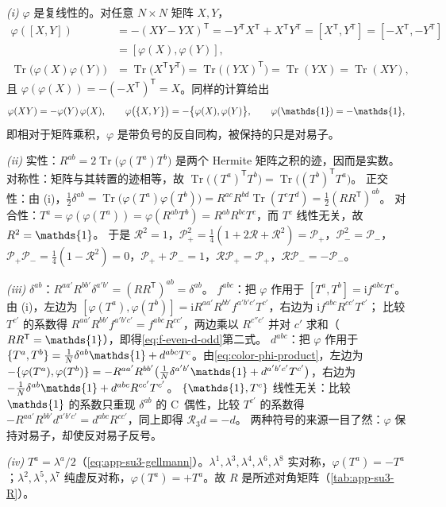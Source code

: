 \documentclass[UTF8,a4paper,11pt,fontset=fandol]{ctexart}
\makeatletter
\let\amsmathbb\mathbb
\renewcommand{\mathbb}[1]{\ifx1#1\mathds{1}\else\amsmathbb{#1}\fi}
\theoremstyle{cplain}
\theoremstyle{cdefinition}
\theoremstyle{cremark}
\renewcommand{\proofname}{证明}
\renewenvironment{proof}[1][\proofname]{\par\pushQED{\qed}\normalfont\topsep6\p@\@plus6\p@\relax
  \trivlist\item[\hskip\labelsep\itshape #1\hspace{0.5em}]\ignorespaces}{\popQED\endtrivlist\@endpefalse}
\numberwithin{equation}{section}
\DeclareMathOperator{\Tr}{Tr}
\newcommand{\tp}{\mathsf{T}}                         %
\newcommand{\Rop}{\mathcal{R}}                       %
\newcommand{\Pp}{\mathcal{P}_{+}}                    %
\newcommand{\Pm}{\mathcal{P}_{-}}                    %
\newcommand{\ii}{\mathrm{i}}                        %
\makeatother
\begin{document}
\begin{proof}
\emph{(i)} $\varphi$ 是复线性的。对任意 $N\times N$ 矩阵 $X,Y$，
\begin{align*}
\varphi([X,Y])&=-(XY-YX)^{\tp}=-Y^{\tp}X^{\tp}+X^{\tp}Y^{\tp}=[X^{\tp},Y^{\tp}]=[-X^{\tp},-Y^{\tp}]\\
&=[\varphi(X),\varphi(Y)],\\
\Tr\bigl(\varphi(X)\varphi(Y)\bigr)&=\Tr\bigl(X^{\tp}Y^{\tp}\bigr)=\Tr\bigl((YX)^{\tp}\bigr)=\Tr(YX)=\Tr(XY),
\end{align*}
且 $\varphi(\varphi(X))=-(-X^{\tp})^{\tp}=X$。同样的计算给出
\begin{equation}\label{eq:color-phi-product}
\varphi(XY)=-\varphi(Y)\,\varphi(X),\qquad \varphi\bigl(\{X,Y\}\bigr)=-\bigl\{\varphi(X),\varphi(Y)\bigr\},\qquad\varphi(\mathbb 1)=-\mathbb 1 ,
\end{equation}
即相对于矩阵乘积，$\varphi$ 是带负号的反自同构，被保持的只是对易子。

\emph{(ii)} 实性：$R^{ab}=2\Tr\bigl(\varphi(T^a)T^b\bigr)$ 是两个 Hermite 矩阵之积的迹，因而是实数。
对称性：矩阵与其转置的迹相等，故 $\Tr\bigl((T^a)^{\tp}T^b\bigr)=\Tr\bigl((T^b)^{\tp}T^a\bigr)$。
正交性：由 (i)，$\tfrac12\delta^{ab}=\Tr\bigl(\varphi(T^a)\varphi(T^b)\bigr)=R^{ac}R^{bd}\Tr(T^cT^d)=\tfrac12(RR^{\tp})^{ab}$。
对合性：$T^a=\varphi(\varphi(T^a))=\varphi(R^{ab}T^b)=R^{ab}R^{bc}T^c$，而 $T^c$ 线性无关，故 $R^2=\mathbb 1$。
于是 $\Rop^2=1$，$\Pp^2=\tfrac14(1+2\Rop+\Rop^2)=\Pp$，$\Pm^2=\Pm$，$\Pp\Pm=\tfrac14(1-\Rop^2)=0$，$\Pp+\Pm=1$，$\Rop\Pp=\Pp$，$\Rop\Pm=-\Pm$。

\emph{(iii)} $\delta^{ab}$：$R^{aa'}R^{bb'}\delta^{a'b'}=(RR^{\tp})^{ab}=\delta^{ab}$。
$f^{abc}$：把 $\varphi$ 作用于 $[T^a,T^b]=\ii f^{abc}T^c$。由 (i)，左边为 $[\varphi(T^a),\varphi(T^b)]=\ii R^{aa'}R^{bb'}f^{a'b'c'}T^{c'}$，右边为 $\ii f^{abc}R^{cc'}T^{c'}$；
比较 $T^{c'}$ 的系数得 $R^{aa'}R^{bb'}f^{a'b'c'}=f^{abc}R^{cc'}$，两边乘以 $R^{c''c'}$ 并对 $c'$ 求和（$RR^{\tp}=\mathbb 1$），即得\cref{eq:f-even-d-odd}第二式。
$d^{abc}$：把 $\varphi$ 作用于 $\{T^a,T^b\}=\frac1N\delta^{ab}\mathbb 1+d^{abc}T^c$。由\cref{eq:color-phi-product}，左边为
$-\{\varphi(T^a),\varphi(T^b)\}=-R^{aa'}R^{bb'}\bigl(\frac1N\delta^{a'b'}\mathbb 1+d^{a'b'c'}T^{c'}\bigr)$，右边为 $-\frac1N\delta^{ab}\mathbb 1+d^{abc}R^{cc'}T^{c'}$。
$\{\mathbb 1,T^c\}$ 线性无关：比较 $\mathbb 1$ 的系数只重现 $\delta^{ab}$ 的 C~偶性，比较 $T^{c'}$ 的系数得 $-R^{aa'}R^{bb'}d^{a'b'c'}=d^{abc}R^{cc'}$，同上即得 $\Rop_3d=-d$。
两种符号的来源一目了然：$\varphi$ 保持对易子，却使反对易子反号。

\emph{(iv)} $T^a=\lambda^a/2$（\cref{eq:app-su3-gellmann}）。$\lambda^1,\lambda^3,\lambda^4,\lambda^6,\lambda^8$ 实对称，$\varphi(T^a)=-T^a$；$\lambda^2,\lambda^5,\lambda^7$ 纯虚反对称，$\varphi(T^a)=+T^a$。故 $R$ 是所述对角矩阵（\cref{tab:app-su3-R}）。
\end{proof}
\end{document}

